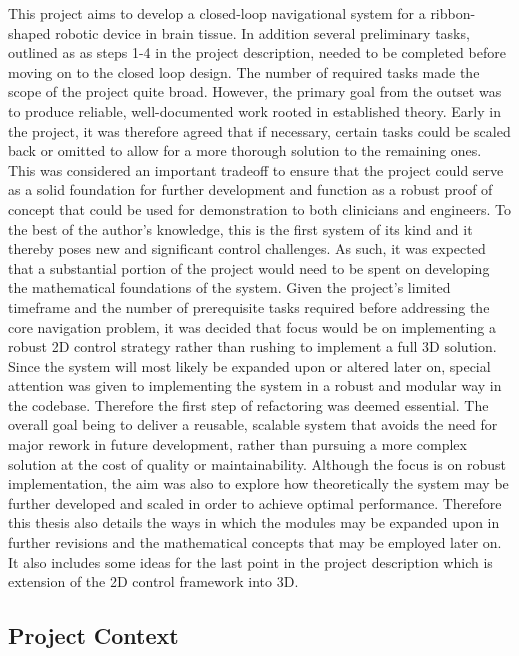 This project aims to develop a closed-loop navigational system for a ribbon-shaped robotic device in brain tissue. In addition several preliminary tasks, outlined as  as steps 1-4 in the project description, needed to be completed before moving on to the closed loop design. The number of required tasks made the scope of the project quite broad. However, the primary goal from the outset was to produce reliable, well-documented work rooted in established theory. Early in the project, it was therefore agreed that if necessary, certain tasks could be scaled back or omitted to allow for a more thorough solution to the remaining ones. This was considered an important tradeoff to ensure that the project could serve as a solid foundation for further development and function as a robust proof of concept that could be used for demonstration to both clinicians and engineers.
\newline \newline
To the best of the author's knowledge, this is the first system of its kind and it thereby poses new and significant control challenges. As such, it was expected that a substantial portion of the project would need to be spent on developing the mathematical foundations of the system. Given the project's limited timeframe and the number of prerequisite tasks required before addressing the core navigation problem, it was decided that focus would be on implementing a robust 2D control strategy rather than rushing to implement a full 3D solution. Since the system will most likely be expanded upon or altered later on, special attention was  given to implementing the system in a robust and modular way in the codebase. Therefore the first step of refactoring was deemed essential. The overall goal being to deliver a reusable, scalable system that avoids the need for major rework in future development, rather than pursuing a more complex solution at the cost of quality or maintainability. 
\newline \newline
Although the focus is on robust implementation, the aim was also to explore how theoretically the system may be further developed and scaled in order to achieve optimal performance. Therefore this thesis also details the ways in which the modules may be expanded upon in further revisions and the mathematical concepts that may be employed later on. It also includes some ideas for the last point in the project description which is extension of the 2D control framework into 3D.

\subsection{Project Context}

